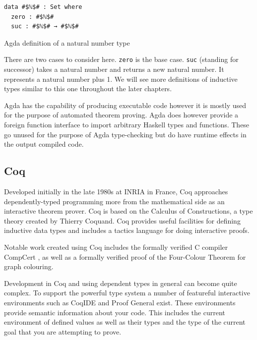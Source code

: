 \documentclass[a4paper, notitlepage]{report}
\begin{document}
\begin{listing}[H]
\begin{verbatim}
data #$ℕ$# : Set where
  zero : #$ℕ$#
  suc : #$ℕ$# → #$ℕ$#
\end{verbatim}
\caption{Agda definition of a natural number type}
\end{listing}

There are two cases to consider here. \texttt{zero} is the base case. \texttt{suc} (standing
for successor) takes a natural number and returns a new natural number. It
represents a natural number plus 1. We will see more definitions of inductive
types similar to this one throughout the later chapters.

Agda has the capability of producing executable code however it is mostly used
for the purpose of automated theorem proving. Agda does however provide a
foreign function interface to import arbitrary Haskell types and functions.
These go unused for the purpose of Agda type-checking but do have runtime
effects in the output compiled code.

\subsection{Coq}
\label{sec:org0d0af13}
Developed initially in the late 1980s at INRIA in France, Coq approaches
dependently-typed programming more from the mathematical side as an interactive
theorem prover. Coq is based on the Calculus of Constructions, a type theory
created by Thierry Coquand. Coq provides useful facilities for defining
inductive data types and includes a tactics language for doing interactive
proofs.

Notable work created using Coq includes the formally verified C compiler
CompCert \cite{compcert}, as well as a formally verified proof of the Four-Colour
Theorem \cite{gonthier_formal_2008} for graph colouring.

Development in Coq and using dependent types in general can become quite
complex. To support the powerful type system a number of featureful interactive
environments such as CoqIDE and Proof General \cite{proof_general} exist. These
environments provide semantic information about your code. This includes the
current environment of defined values as well as their types and the type of the
current goal that you are attempting to prove.
\end{document}
